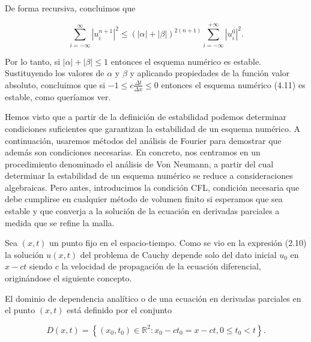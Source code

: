 \begin{example}
  De forma recursiva, concluimos que

  \begin{equation*}
    \sum_{i=-\infty}^{\infty}
    {\left|u^{n+1}_{i}\right|}^{2}\leq
    {
      \left(
      \left|\alpha\right|+
      \left|\beta\right|
      \right)
    }^{2\left(n+1\right)}
    \sum_{i=-\infty}^{+\infty}
    {\left|u^{0}_{i}\right|}^{2}.
  \end{equation*}

  Por lo tanto, si
  \begin{math}
    \left|\alpha\right|+
    \left|\beta\right|\leq
    1
  \end{math}
  entonces el esquema numérico es estable.
  Sustituyendo los valores de $\alpha$ y $\beta$ y aplicando
  propiedades de la función valor absoluto, concluimos que si
  \begin{math}
    -1\leq
    c\frac{\Delta t}{\Delta x}\leq
    0
  \end{math}
  entonces el esquema numérico (4.11) es estable, como queríamos ver.
\end{example}

Hemos visto que a partir de la definición de estabilidad podemos
determinar condiciones suficientes que garantizan la estabilidad de
un esquema numérico.
A continuación, usaremos métodos del análisis de Fourier para
demostrar que además son condiciones necesarias.
En concreto, nos centramos en un procedimiento denominado el análisis
de Von Neumann, a partir del cual determinar la estabilidad de un
esquema numérico se reduce a consideraciones algebraicas.
Pero antes, introducimos la condición CFL, condición necesaria que
debe cumplirse en cualquier método de volumen finito si esperamos que
sea estable y que converja a la solución de la ecuación en derivadas
parciales a medida que se refine la malla.

Sea $\left(x,t\right)$ un punto fijo en el espacio-tiempo.
Como se vio en la expresión (2.10) la solución $u\left(x,t\right)$
del problema de Cauchy depende solo del dato inicial $u_{0}$ en
$x-ct$ siendo $c$ la velocidad de propagación de la ecuación
diferencial, originándose el siguiente concepto.

\begin{definition}
  El dominio de dependencia analítico o de una ecuación en derivadas
  parciales en el punto $\left(x,t\right)$ está definido por el
  conjunto

  \begin{equation*}
    D\left(x,t\right)=
    \left\{
    \left(x_{0},t_{0}\right)\in\mathbb{R}^{2}:
    x_{0}-ct_{0}=x-ct,
    0\leq t_{0}<t
    \right\}.
  \end{equation*}
\end{definition}

